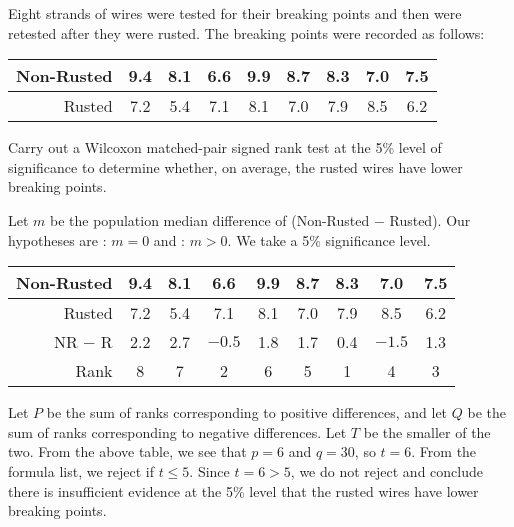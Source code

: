 \begin{sample}
    Eight strands of wires were tested for their breaking points and then were retested after they were rusted. The breaking points were recorded as follows:

    \begin{table}[H]
        \centering
        \begin{tabular}{|r|c|c|c|c|c|c|c|c|}
            \hline
            Non-Rusted & 9.4 & 8.1 & 6.6 & 9.9 & 8.7 & 8.3 & 7.0 & 7.5 \\ \hline
            Rusted & 7.2 & 5.4 & 7.1 & 8.1 & 7.0 & 7.9 & 8.5 & 6.2 \\ \hline
        \end{tabular}
    \end{table}

    Carry out a Wilcoxon matched-pair signed rank test at the 5\% level of significance to determine whether, on average, the rusted wires have lower breaking points.
\end{sample}
\begin{sampans}
    Let $m$ be the population median difference of (Non-Rusted $-$ Rusted). Our hypotheses are \nullhyp: $m = 0$ and \althyp: $m > 0$. We take a 5\% significance level.

    \begin{table}[H]
    \centering
    \begin{tabular}{|r|c|c|c|c|c|c|c|c|}
        \hline
        Non-Rusted & 9.4 & 8.1 & 6.6 & 9.9 & 8.7 & 8.3 & 7.0 & 7.5 \\ \hline
        Rusted & 7.2 & 5.4 & 7.1 & 8.1 & 7.0 & 7.9 & 8.5 & 6.2 \\ \hline
        NR $-$ R & 2.2 & 2.7 & $-0.5$ & 1.8 & 1.7 & 0.4 & $-1.5$ & 1.3 \\ \hline
        Rank & 8 & 7 & 2 & 6 & 5 & 1 & 4 & 3 \\ \hline
    \end{tabular}
    \end{table}

    Let $P$ be the sum of ranks corresponding to positive differences, and let $Q$ be the sum of ranks corresponding to negative differences. Let $T$ be the smaller of the two. From the above table, we see that $p = 6$ and $q = 30$, so $t = 6$. From the formula list, we reject \nullhyp{} if $t \leq 5$. Since $t = 6 > 5$, we do not reject \nullhyp{} and conclude there is insufficient evidence at the 5\% level that the rusted wires have lower breaking points.
\end{sampans}

